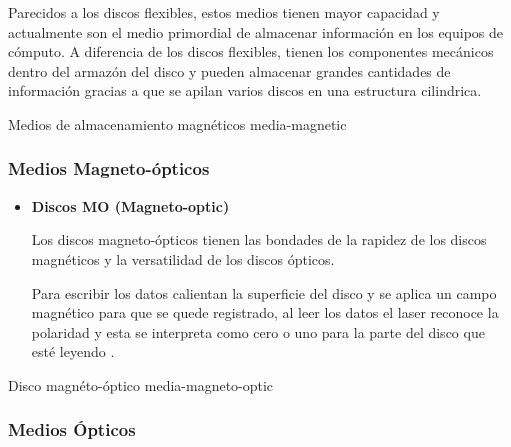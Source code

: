 \begin{itemize}
Parecidos a los discos flexibles, estos medios tienen mayor capacidad y actualmente son el medio primordial de almacenar informaci\'{o}n en los equipos de c\'{o}mputo. A diferencia de los discos flexibles, tienen los componentes mec\'{a}nicos dentro del armaz\'{o}n del disco y pueden almacenar grandes cantidades de informaci\'{o}n gracias a que se apilan varios discos en una estructura cilindrica.
\end{itemize}

\diagramblock
{Medios de almacenamiento magn\'{e}ticos}
{media-magnetic}
{
 {
  
 }
}

      \subsubsection*{Medios Magneto-\'{o}pticos}

\begin{itemize}

  \item \textbf{Discos MO (Magneto-optic)}

Los discos magneto-\'{o}pticos tienen las bondades de la rapidez de los discos magn\'{e}ticos y la versatilidad de los discos \'{o}pticos.

Para escribir los datos calientan la superficie del disco y se aplica un campo magn\'{e}tico para que se quede registrado, al leer los datos el laser reconoce la polaridad y esta se interpreta como cero o uno para la parte del disco que est\'{e} leyendo \cite{_illustrated_????}.

\end{itemize}

\diagramblock
{Disco magn\'{e}to-\'{o}ptico}
{media-magneto-optic}
{
 {
  
 }
}

      \subsubsection*{Medios \'{O}pticos}

